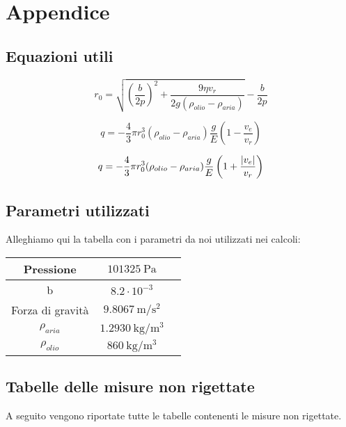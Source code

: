 \section{Appendice}
\subsection{Equazioni utili}
    \begin{equation}
    \label{raggio}
        r_0 = \sqrt{\left( \frac{b}{2p} \right)^2 + \frac{9\eta v_r}{2g(\rho_{olio} - \rho_{aria})}} -  \frac{b}{2p}
    \end{equation}

    \begin{equation}
    \label{caricapos}
        q = -\frac{4}{3}\pi r_0^3 (\rho_{olio} - \rho_{aria}) \frac{g}{E}\left( 1 - \frac{v_e}{v_r} \right)
    \end{equation}

    \begin{equation}
    \label{caricaneg}
        q = -\frac{4}{3}\pi r_0^3 (\rho_{olio} - \rho_{aria}) \frac{g}{E}\left( 1 + \frac{\abs{v_e}}{v_r} \right)
    \end{equation}
\subsection{Parametri utilizzati}
Alleghiamo qui la tabella con i parametri da noi utilizzati nei calcoli:
    \begin{center}
        \begin{tabular}{ |c|c|c| }
             \hline
             Pressione & $101325~\mathrm{Pa}$ \\
             \hline
             b & $8.2\cdot10^{-3}$ \\
             \hline
             Forza di gravità & $9.8067~\mathrm{m/s^2}$ \\ 
             \hline
             $\rho_{aria}$ & $1.2930~\mathrm{kg/m^3}$ \\ 
             \hline
             $\rho_{olio}$ & $860~\mathrm{kg/m^3}$ \\ 
             \hline
        \end{tabular}
    \end{center}
    \subsection{Tabelle delle misure non rigettate}
    A seguito vengono riportate tutte le tabelle contenenti le misure non rigettate.
        
        
        